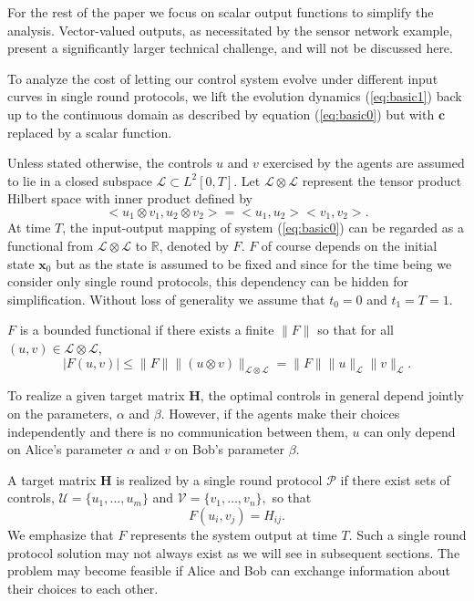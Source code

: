 \documentclass[12pt,onecolumn,draftcls]{IEEEtran}
\newcommand{\bc}{\mathbf{c}}
\newcommand{\bx}{\mathbf{x}}
\newcommand{\bH}{\mathbf{H}}
\newcommand{\cP}{\mathcal{P}}
\newcommand{\cU}{\mathcal{U}}
\newcommand{\cV}{\mathcal{V}}
\begin{document}
For the rest of the paper we focus on scalar output functions to simplify the analysis.
Vector-valued outputs, as necessitated by the sensor network example, present a significantly
larger technical challenge, and will not be discussed here.

To analyze the cost of letting our control system evolve under different input curves in single round protocols,
we lift the evolution dynamics (\ref{eq:basic1}) back up to the continuous domain as described by equation (\ref{eq:basic0}) but with $\bc$ replaced
by a scalar function.

Unless stated otherwise, the controls $u$ and $v$ exercised by the agents are assumed to lie in a closed subspace $\mathcal{L}\subset L^2[0,T]$.
Let $\mathcal{L} \otimes\mathcal{L}$ represent the tensor product Hilbert space with inner product defined by
\begin{equation}
<u_1 \otimes v_1, u_2 \otimes v_2>=<u_1, u_2><v_1, v_2>.
\end{equation}
At time $T$, the input-output mapping of system (\ref{eq:basic0}) can be regarded as a functional from 
$\mathcal{L}\otimes\mathcal{L}$ to $\mathbb{R}$, denoted by $F$. $F$ of course depends
on the initial state $\bx_0$ but as the state is assumed to be fixed and since for the time being we consider
only single round protocols, this dependency can be hidden for simplification.
Without loss of generality we assume that $t_0=0$ and $t_1=T=1$.  

$F$ is a bounded functional if there exists a finite $\|F\|$ so that for all $(u,v) \in \mathcal{L}\otimes\mathcal{L}$,
\begin{equation}
|F(u,v)|  \leq \|F\| \|(u \otimes v)\|_{\mathcal{L}\otimes\mathcal{L}} = \|F\| \|u\|_{\mathcal{L}} \|v\|_{\mathcal{L}}.
\label{eq:boundedF}
\end{equation}

To realize a given target matrix $\bH$, the optimal controls in general depend jointly on the 
parameters, $\alpha$ and $\beta$.  However, if the agents make their choices independently and there is no communication
between them, $u$ can only depend on Alice's parameter $\alpha$ and $v$ on Bob's parameter $\beta$.

A target matrix $\bH$ is realized by a single round protocol $\cP$ if there exist sets of 
controls, $\cU=\{ u_1,\ldots, u_m \}$ and $\cV=\{ v_1,\ldots, v_n \},$ so that
\begin{equation}
F(u_i,v_j)=H_{ij}.
\end{equation}
We emphasize that $F$ represents the system output at time $T$.
Such a single round protocol solution may not always exist as we will see in subsequent sections.
The problem may become feasible if Alice and Bob can exchange information about their choices to each other.
\end{document}
